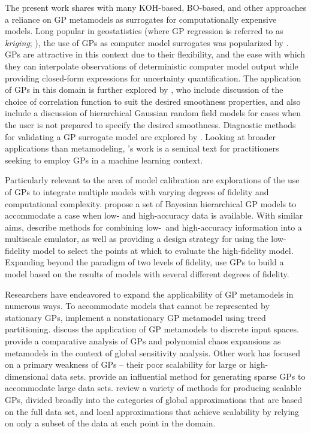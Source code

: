 \documentclass[10pt,a4paper]{article}
\begin{document}
The present work shares with many KOH-based, BO-based, and other approaches a reliance on GP metamodels as surrogates for computationally expensive models.
Long popular in geostatistics (where GP regression is referred to as \textit{kriging}; \cite{Cressie2015}), the use of GPs as computer model surrogates was popularized by \citet{Sacks1989}.
GPs are attractive in this context due to their flexibility, and the ease with which they can interpolate observations of deterministic computer model output while providing closed-form expressions for uncertainty quantification.
The application of GPs in this domain is further explored by \citet{Santner2003a}, who include discussion of the choice of correlation function to suit the desired smoothness properties, and also include a discussion of hierarchical Gaussian random field models for cases when the user is not prepared to specify the desired smoothness.
Diagnostic methods for validating a GP surrogate model are explored by \citet{Bastos2009}.
Looking at broader applications than metamodeling, \citeauthor{Rasmussen2006}'s \citeyearpar{Rasmussen2006} work is a seminal text for practitioners seeking to employ GPs in a machine learning context.

Particularly relevant to the area of model calibration are explorations of the use of GPs to integrate multiple models with varying degrees of fidelity and computational complexity.
\citet{Qian2008a} propose a set of Bayesian hierarchical GP models to accommodate a case when low- and high-accuracy data is available.
With similar aims, \citet{Cumming2009} describe methods for combining low-\ and high-accuracy information into a multiscale emulator, as well as providing a design strategy for using the low-fidelity model to select the points at which to evaluate the high-fidelity model.
Expanding beyond the paradigm of two levels of fidelity, \citet{Goh2013} use GPs to build a model based on the results of models with several different degrees of fidelity.

Researchers have endeavored to expand the applicability of GP metamodels in numerous ways.
To accommodate models that cannot be represented by stationary GPs, \cite{Gramacy2008} implement a nonstationary GP metamodel using treed partitioning.
\citet{Qian2008} discuss the application of GP metamodels to discrete input spaces.
\citet{Gratiet2016} provide a comparative analysis of GPs and polynomial chaos expansions as metamodels in the context of global sensitivity analysis.
Other work has focused on a primary weakness of GPs -- their poor scalability for large or high-dimensional data sets.
\citet{Snelson2006} provide an influential method for generating sparse GPs to accommodate large data sets.
\citet{Liu2020} review a variety of methods for producing scalable GPs, divided broadly into the categories of global approximations that are based on the full data set, and local approximations that achieve scalability by relying on only a subset of the data at each point in the domain.
\end{document}

